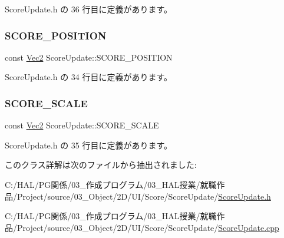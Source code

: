  Score\+Update.\+h の 36 行目に定義があります。

\mbox{\label{class_score_update_a88bd91fc66dd629a849ab9f0a178150c}} 
\subsubsection{\texorpdfstring{S\+C\+O\+R\+E\+\_\+\+P\+O\+S\+I\+T\+I\+ON}{SCORE\_POSITION}}
{\footnotesize\ttfamily const \mbox{\hyperlink{_vector3_d_8h_a5ef6e95dfc5f9d3820b71772d99bbc25}{Vec2}} Score\+Update\+::\+S\+C\+O\+R\+E\+\_\+\+P\+O\+S\+I\+T\+I\+ON\hspace{0.3cm}{\ttfamily [static]}}



 Score\+Update.\+h の 34 行目に定義があります。

\mbox{\label{class_score_update_a23e9b8c4c6624cf5f3b66258771b3243}} 
\subsubsection{\texorpdfstring{S\+C\+O\+R\+E\+\_\+\+S\+C\+A\+LE}{SCORE\_SCALE}}
{\footnotesize\ttfamily const \mbox{\hyperlink{_vector3_d_8h_a5ef6e95dfc5f9d3820b71772d99bbc25}{Vec2}} Score\+Update\+::\+S\+C\+O\+R\+E\+\_\+\+S\+C\+A\+LE\hspace{0.3cm}{\ttfamily [static]}}



 Score\+Update.\+h の 35 行目に定義があります。



このクラス詳解は次のファイルから抽出されました\+:\begin{DoxyCompactItemize}
\item 
C\+:/\+H\+A\+L/\+P\+G関係/03\+\_\+作成プログラム/03\+\_\+\+H\+A\+L授業/就職作品/\+Project/source/03\+\_\+\+Object/2\+D/\+U\+I/\+Score/\+Score\+Update/\mbox{\hyperlink{_score_update_8h}{Score\+Update.\+h}}\item 
C\+:/\+H\+A\+L/\+P\+G関係/03\+\_\+作成プログラム/03\+\_\+\+H\+A\+L授業/就職作品/\+Project/source/03\+\_\+\+Object/2\+D/\+U\+I/\+Score/\+Score\+Update/\mbox{\hyperlink{_score_update_8cpp}{Score\+Update.\+cpp}}\end{DoxyCompactItemize}
